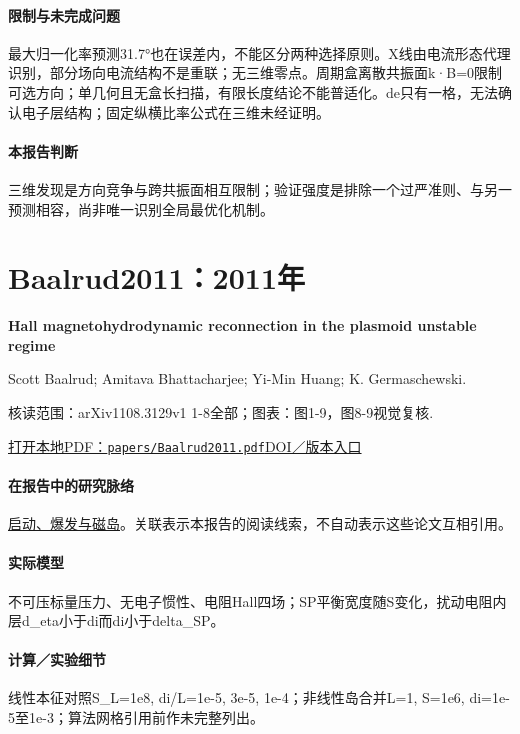 \documentclass[UTF8,a4paper,11pt,openany,fontset=fandol]{ctexbook}
\begin{document}
\paragraph{限制与未完成问题}最大归一化率预测31.7°也在误差内，不能区分两种选择原则。X线由电流形态代理识别，部分场向电流结构不是重联；无三维零点。周期盒离散共振面k·B=0限制可选方向；单几何且无盒长扫描，有限长度结论不能普适化。de只有一格，无法确认电子层结构；固定纵横比率公式在三维未经证明。

\paragraph{本报告判断}三维发现是方向竞争与跨共振面相互限制；验证强度是排除一个过严准则、与另一预测相容，尚非唯一识别全局最优化机制。

\section{Baalrud2011：2011年}\label{paper:Baalrud2011}

\textbf{Hall magnetohydrodynamic reconnection in the plasmoid unstable regime}\citep{Baalrud2011}\

Scott Baalrud;  Amitava Bhattacharjee;  Yi-Min Huang;  K. Germaschewski.

\textsf{核读范围：}arXiv1108.3129v1 1-8全部；\textsf{图表：}图1-9，图8-9视觉复核.

\href{run:../papers/Baalrud2011.pdf}{打开本地PDF：\texttt{papers/Baalrud2011.pdf}}\quad\href{https://doi.org/10.1063/1.3633473}{DOI／版本入口}

\paragraph{在报告中的研究脉络}\hyperref[story:onset]{启动、爆发与磁岛}。关联表示本报告的阅读线索，不自动表示这些论文互相引用。

\paragraph{实际模型}不可压标量压力、无电子惯性、电阻Hall四场；SP平衡宽度随S变化，扰动电阻内层d\_eta小于di而di小于delta\_SP。

\paragraph{计算／实验细节}线性本征对照S\_L=1e8, di/L=1e-5, 3e-5, 1e-4；非线性岛合并L=1, S=1e6, di=1e-5至1e-3；算法网格引用前作未完整列出。
\end{document}
